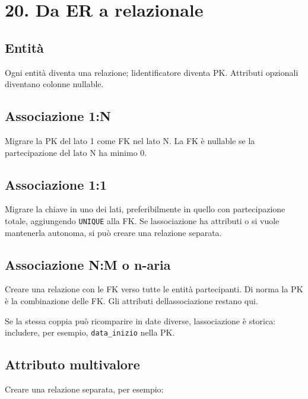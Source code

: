 \documentclass[
  10pt,
  a4paper,
]{article}
\begin{document}
\section{20. Da ER a relazionale}\label{20-da-er-a-relazionale}

\subsection{Entità}\label{entituxe0}

Ogni entità diventa una relazione; l\textquotesingle identificatore
diventa PK. Attributi opzionali diventano colonne nullable.

\subsection{Associazione 1:N}\label{associazione-1n}

Migrare la PK del lato 1 come FK nel lato N. La FK è nullable se la
partecipazione del lato N ha minimo 0.

\subsection{Associazione 1:1}\label{associazione-11}

Migrare la chiave in uno dei lati, preferibilmente in quello con
partecipazione totale, aggiungendo \texttt{UNIQUE} alla FK. Se
l\textquotesingle associazione ha attributi o si vuole mantenerla
autonoma, si può creare una relazione separata.

\subsection{Associazione N:M o n-aria}\label{associazione-nm-o-n-aria}

Creare una relazione con le FK verso tutte le entità partecipanti. Di
norma la PK è la combinazione delle FK. Gli attributi
dell\textquotesingle associazione restano qui.

Se la stessa coppia può ricomparire in date diverse,
l\textquotesingle associazione è storica: includere, per esempio,
\texttt{data\_inizio} nella PK.

\subsection{Attributo multivalore}\label{attributo-multivalore}

Creare una relazione separata, per esempio:
\end{document}
